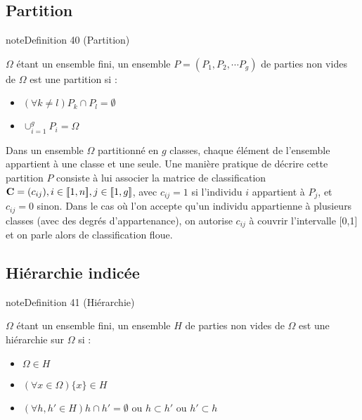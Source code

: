 \documentclass[letterpaper,10pt,french]{sphinxmanual}
\begin{document}
\subsection{Partition}
\label{\detokenize{clustering:partition}}
\ignorespaces \label{clustering:definition-0}
\begin{sphinxadmonition}{note}{Definition 40 (Partition)}



\sphinxAtStartPar
\(\Omega\) étant un ensemble fini, un ensemble \(P =(P_1 ,P_2 ,\cdots  P_g )\) de parties non vides de   \(\Omega\) est une partition si :
\begin{itemize}
\item {} 
\sphinxAtStartPar
\((\forall k\neq l) P_k \cap P_l=\emptyset\)

\item {} 
\sphinxAtStartPar
\(\displaystyle\cup_{i=1}^gP_i=\Omega\)

\end{itemize}
\end{sphinxadmonition}

\sphinxAtStartPar
Dans un ensemble  \(\Omega\) partitionné en \(g\) classes, chaque élément de l’ensemble appartient à une classe et une seule. Une manière pratique de décrire cette partition \(P\) consiste à lui associer la matrice de classification \({\bf C}=(c_{ij}), i\in [\![1,n]\!], j\in [\![1,g]\!]\), avec \(c_{ij}=1\) si l’individu \(i\) appartient à \(P_j\), et \(c_{ij}=0\) sinon. Dans le cas où l’on accepte qu’un individu appartienne à plusieurs classes (avec des degrés d’appartenance), on autorise \(c_{ij}\) à couvrir l’intervalle {[}0,1{]} et on parle alors de classification floue.


\subsection{Hiérarchie indicée}
\label{\detokenize{clustering:hierarchie-indicee}}
\ignorespaces \label{clustering:definition-1}
\begin{sphinxadmonition}{note}{Definition 41 (Hiérarchie)}



\sphinxAtStartPar
\(\Omega\) étant un ensemble fini, un ensemble \(H\) de parties non vides de \(\Omega\) est une hiérarchie sur \(\Omega\) si :
\begin{itemize}
\item {} 
\sphinxAtStartPar
\(\Omega \in H\)

\item {} 
\sphinxAtStartPar
\((\forall x\in \Omega) \{x\}\in H\)

\item {} 
\sphinxAtStartPar
\((\forall h,h'\in H) h\cap h'=\emptyset\) ou \(h\subset h'\) ou \(h'\subset h\)

\end{itemize}
\end{sphinxadmonition}
\end{document}
